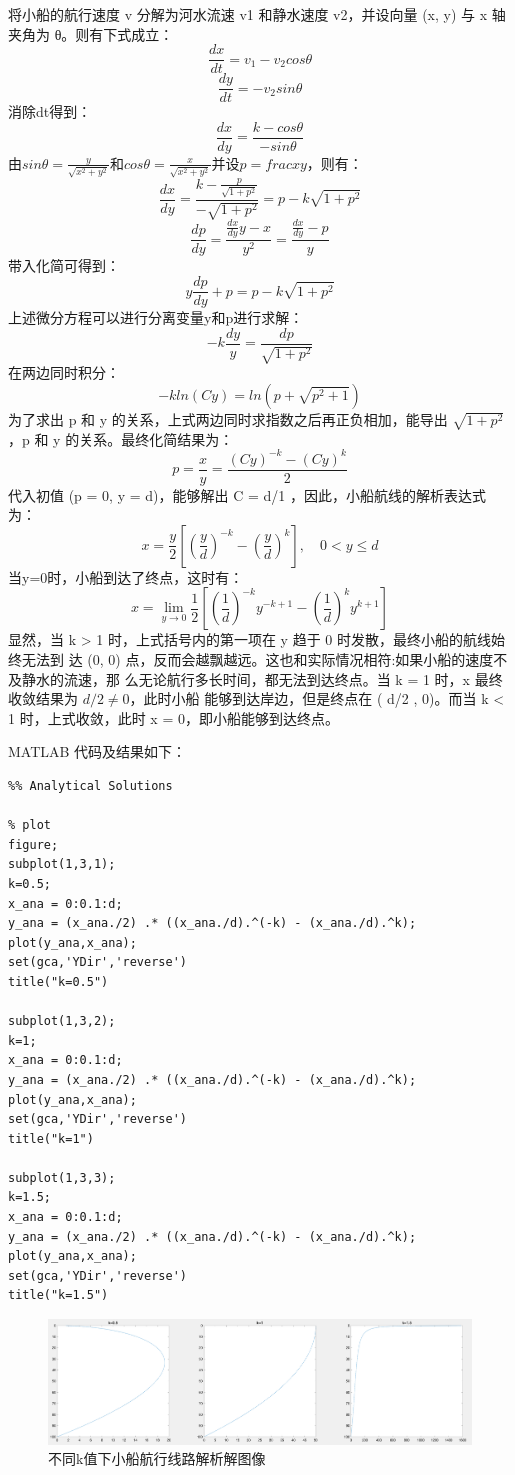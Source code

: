\documentclass{article}
\begin{document}
将小船的航行速度 v 分解为河水流速 v1 和静水速度 v2，并设向量 (x, y) 与 x 轴夹角为 θ。则有下式成立：
$$\frac{dx}{dt}=v_1-v_2cos\theta$$
$$\frac{dy}{dt}=-v_2sin\theta$$
消除dt得到：
$$\frac{dx}{dy}=\frac{k-cos\theta}{-sin\theta}$$
由$sin\theta=\frac{y}{\sqrt{x^2+y^2}}$和$cos\theta=\frac{x}{\sqrt{x^2+y^2}}$并设$p=frac{x}{y}$，则有：
$$\frac{dx}{dy}=\frac{k-\frac{p}{\sqrt{1+p^2}}}{-\sqrt{1+p^2}}=p-k\sqrt{1+p^2}$$
$$\frac{dp}{dy}=\frac{\frac{dx}{dy}y-x}{y^2}=\frac{\frac{dx}{dy}-p}{y}$$
带入化简可得到：
$$y\frac{dp}{dy}+p=p-k\sqrt{1+p^2}$$
上述微分方程可以进行分离变量y和p进行求解：
$$-k\frac{dy}{y}=\frac{dp}{\sqrt{1+p^2}}$$
在两边同时积分：{}
$$-kln(Cy)=ln(p+\sqrt{p^2+1})$$
为了求出 p 和 y 的关系，上式两边同时求指数之后再正负相加，能导出 $\sqrt{1 + p^2}$，p 和
y 的关系。最终化简结果为：
$$p=\frac{x}{y}=\frac{(Cy)^{-k}-(Cy)^k}{2}$$
代入初值 (p = 0, y = d)，能够解出 C = d/1 ，因此，小船航线的解析表达式为：
$$x=\frac{y}{2}[(\frac{y}{d})^{-k}-(\frac{y}{d})^k],\quad 0<y\leq d$$
当y=0时，小船到达了终点，这时有：
$$x=\lim\limits_{y\to 0}\frac{1}{2}[(\frac{1}{d})^{-k}y^{-k+1}-(\frac{1}{d})^ky^{k+1}]$$
显然，当 k > 1 时，上式括号内的第一项在 y 趋于 0 时发散，最终小船的航线始终无法到
达 (0, 0) 点，反而会越飘越远。这也和实际情况相符:如果小船的速度不及静水的流速，那 么无论航行多长时间，都无法到达终点。当 k = 1 时，x 最终收敛结果为 $d/2 \neq 0$，此时小船 能够到达岸边，但是终点在 ( d/2 , 0)。而当 k < 1 时，上式收敛，此时 x = 0，即小船能够到达终点。

MATLAB 代码及结果如下：
\begin{lstlisting}
%% Analytical Solutions

% plot
figure;
subplot(1,3,1);
k=0.5;
x_ana = 0:0.1:d;
y_ana = (x_ana./2) .* ((x_ana./d).^(-k) - (x_ana./d).^k);
plot(y_ana,x_ana);
set(gca,'YDir','reverse')
title("k=0.5")

subplot(1,3,2);
k=1;
x_ana = 0:0.1:d;
y_ana = (x_ana./2) .* ((x_ana./d).^(-k) - (x_ana./d).^k);
plot(y_ana,x_ana);
set(gca,'YDir','reverse')
title("k=1")

subplot(1,3,3);
k=1.5;
x_ana = 0:0.1:d;
y_ana = (x_ana./2) .* ((x_ana./d).^(-k) - (x_ana./d).^k);
plot(y_ana,x_ana);
set(gca,'YDir','reverse')
title("k=1.5")

\end{lstlisting}

\begin{figure}[H]
    \centering
    \includegraphics[width=1\textwidth]{pic1.png}
    \caption{不同k值下小船航行线路解析解图像}
\end{figure}
\end{document}
